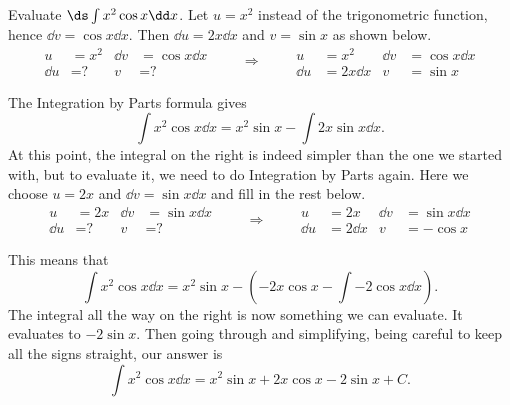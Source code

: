 \begin{example}\label{ex_ibp3}%
Evaluate $\ds\int x^2\cos x\dd x$.
\solution
Let $u=x^2$ instead of the trigonometric function, hence $\dd v=\cos x\dd x$.  Then $\dd u=2x\dd x$ and $v=\sin x$ as shown below.
\[
\begin{aligned}
u&= x^2 & \dd v&=\cos x\dd x\\
\dd u&= \text{?} & v&=\text{?}
\end{aligned}
\qquad\Rightarrow\qquad
\begin{aligned}
u&= x^2 & \dd v&=\cos x\dd x\\
\dd u&= 2x\dd x & v&=\sin x
\end{aligned}
\]

The Integration by Parts formula gives
\[\int x^2\cos x\dd x = x^2\sin x - \int 2x\sin x\dd x.\]
At this point, the integral on the right is indeed simpler than the one we started with, but to evaluate it, we need to do Integration by Parts again. Here we choose $u=2x$ and $\dd v=\sin x\dd x$ and fill in the rest below.
\[
\begin{aligned}
u&= 2x & \dd v&=\sin x\dd x\\
\dd u&= \text{?} & v&=\text{?}
\end{aligned}
\qquad\Rightarrow\qquad
\begin{aligned}
u&= 2x & \dd v&=\sin x\dd x\\
\dd u&= 2\dd x & v&=-\cos x
\end{aligned}
\]

This means that
\[\int x^2\cos x\dd x = x^2\sin x - \left(-2x\cos x - \int -2\cos x\dd x\right).\]
The integral all the way on the right is now something we can evaluate.  It evaluates to $-2\sin x$.  Then going through and simplifying, being careful to keep all the signs straight, our answer is
\[\int x^2\cos x\dd x = x^2\sin x  + 2x\cos x - 2\sin x + C.\]
\end{example}


